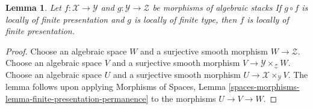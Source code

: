 \documentclass[10pt,a4paper]{amsart}
\theoremstyle{plain}
\newtheorem{lemma}[subsection]{Lemma}
\theoremstyle{definition}
\theoremstyle{remark}
\numberwithin{equation}{subsection}
\begin{document}
\begin{lemma}
\label{lemma-finite-presentation-permanence}
Let $f : \mathcal{X} \to \mathcal{Y}$ and
$g : \mathcal{Y} \to \mathcal{Z}$ be morphisms of algebraic stacks
If $g \circ f$ is locally of finite presentation and $g$ is locally of
finite type, then $f$ is locally of finite presentation.
\end{lemma}

\begin{proof}
Choose an algebraic space $W$ and a surjective smooth morphism
$W \to \mathcal{Z}$.
Choose an algebraic space $V$ and a surjective smooth morphism
$V \to \mathcal{Y} \times_\mathcal{Z} W$.
Choose an algebraic space $U$ and a surjective smooth morphism
$U \to \mathcal{X} \times_\mathcal{Y} V$.
The lemma follows upon applying
Morphisms of Spaces, Lemma
\ref{spaces-morphisms-lemma-finite-presentation-permanence}
to the morphisms $U \to V \to W$.
\end{proof}
\end{document}
